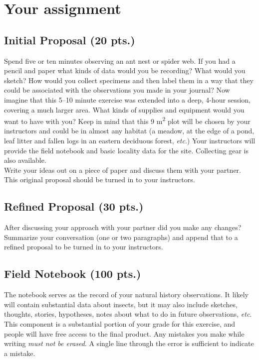 \documentclass[letterpaper, 11pt]{article}
\begin{document}
\section*{Your assignment}

\subsection*{Initial Proposal (20 pts.)}
Spend five or ten minutes observing an ant nest or spider web. If you had a pencil and paper what kinds of data would you be recording? What would you sketch? How would you collect specimens and then label them in a way that they could be associated with the observations you made in your journal? Now imagine that this 5--10 minute exercise was extended into a deep, 4-hour session, covering a much larger area. What kinds of supplies and equipment would you want to have with you? Keep in mind that this 9 m\textsuperscript{2} plot will be chosen by your instructors and could be in almost any habitat (a meadow, at the edge of a pond, leaf litter and fallen logs in an eastern deciduous forest, \textit{etc}.) Your instructors will provide the field notebook and basic locality data for the site. Collecting gear is also available.\\

\noindent{}Write your ideas out on a piece of paper and discuss them with your partner. This original proposal should be turned in to your instructors.

\subsection*{Refined Proposal (30 pts.)}
After discussing your approach with your partner did you make any changes? Summarize your conversation (one or two paragraphs) and append that to a refined proposal to be turned in to your instructors.

\subsection*{Field Notebook (100 pts.)}
The notebook serves as the record of your natural history observations. It likely will contain substantial data about insects, but it may also include sketches, thoughts, stories, hypotheses, notes about what to do in future observations, \textit{etc}. This component is a substantial portion of your grade for this exercise, and people will have free access to the final product. Any mistakes you make while writing \textit{must not be erased}. A single line through the error is sufficient to indicate a mistake.\\
\end{document}
